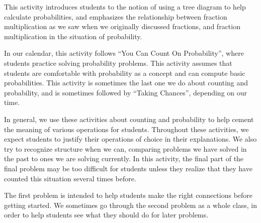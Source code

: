 \documentclass[nooutcomes]{ximera}
\begin{document}
\begin{instructorNotes}
This activity introduces students to the notion of using a tree diagram to help calculate probabilities, and emphasizes the relationship between fraction multiplication as we saw when we originally discussed fractions, and fraction multiplication in the situation of probability.  

In our calendar, this activity follows ``You Can Count On Probability'', where students practice solving probability problems.  This activity assumes that students are comfortable with probability as a concept and can compute basic probabilities.  This activity is sometimes the last one we do about counting and probability, and is sometimes followed by ``Taking Chances'', depending on our time.

In general, we use these activities about counting and probability to help cement the meaning of various operations for students.  Throughout these activities, we expect students to justify their operations of choice in their explanations.  We also try to recognize structure when we can, comparing problems we have solved in the past to ones we are solving currently.  In this activity, the final part of the final problem may be too difficult for students unless they realize that they have counted this situation several times before.

The first problem is intended to help students make the right connections before getting started.  We sometimes go through the second problem as a whole class, in order to help students see what they should do for later problems.


\end{instructorNotes}
\end{document}
